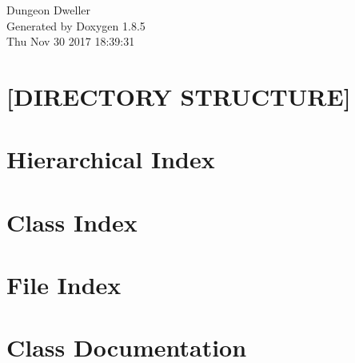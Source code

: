 \documentclass[twoside]{book}
\newcommand{\clearemptydoublepage}{%
  \newpage{\pagestyle{empty}\cleardoublepage}%
}
\begin{document}
\hypersetup{pageanchor=false}
\begin{titlepage}
\vspace*{7cm}
\begin{center}%
{\Large Dungeon Dweller }\\
\vspace*{1cm}
{\large Generated by Doxygen 1.8.5}\\
\vspace*{0.5cm}
{\small Thu Nov 30 2017 18:39:31}\\
\end{center}
\end{titlepage}
\clearemptydoublepage
\tableofcontents
\clearemptydoublepage
{}
\hypersetup{pageanchor=true}

\chapter{\mbox{[}D\-I\-R\-E\-C\-T\-O\-R\-Y S\-T\-R\-U\-C\-T\-U\-R\-E\mbox{]}}
\label{md__home_rigt2720_Kodika_README}
\hypertarget{md__home_rigt2720_Kodika_README}{}

\chapter{Hierarchical Index}

\chapter{Class Index}

\chapter{File Index}

\chapter{Class Documentation}

























































\end{document}
